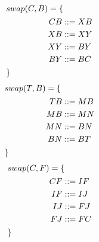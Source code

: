     \begin{align}
        & swap(C,B) = \{ \notag\\
        &\hphantom{{}swap(C,B) }\begin{aligned}
            CB &::= XB\\
            XB &::= XY\\
            XY &::= BY\\
            BY &::= BC
        \end{aligned}\\
        &\} \notag
    \end{align}
    \begin{align}
        & swap(T,B) = \{ \notag\\
        &\hphantom{{}swap(T,B) }\begin{aligned}
            TB &::= MB\\
            MB &::= MN\\
            MN &::= BN\\
            BN &::= BT
        \end{aligned}\\
        &\} \notag
    \end{align}
    \begin{align}
        & swap(C,F) = \{ \notag\\
        &\hphantom{{}swap(C,F) }\begin{aligned}
            CF &::= IF\\
            IF &::= IJ\\
            IJ &::= FJ\\
            FJ &::= FC
        \end{aligned}\\
        &\} \notag
    \end{align}
